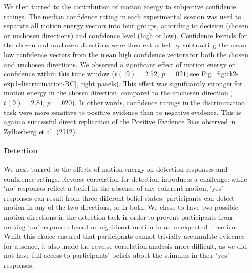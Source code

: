 \documentclass[12pt,twoside]{reedthesis}
\begin{document}
We then turned to the contribution of motion energy to subjective confidence ratings. The median confidence rating in each experimental session was used to separate all motion energy vectors into four groups, according to decision (chosen or unchosen directions) and confidence level (high or low). Confidence kernels for the chosen and unchosen directions were then extracted by subtracting the mean low confidence vectors from the mean high confidence vectors for both the chosen and unchosen directions. We observed a significant effect of motion energy on confidence within this time window (\(t(19) = 2.52\), \(p = .021\); see Fig. \ref{fig:ch2-exp1-discrimination-RC}, right panels). This effect was significantly stronger for motion energy in the chosen direction, compared to the unchosen direction (\(t(9) = 2.81\), \(p = .020\)). In other words, confidence ratings in the discrimination task were more sensitive to positive evidence than to negative evidence. This is again a successful direct replication of the Positive Evidence Bias observed in Zylberberg et al. (2012).

\hypertarget{detection}{%
\paragraph{Detection}\label{detection}}

We next turned to the effects of motion energy on detection responses and confidence ratings. Reverse correlation for detection introduces a challenge: while `no' responses reflect a belief in the absence of any coherent motion, `yes' responses can result from three different belief states: participants can detect motion in any of the two directions, or in both. We chose to have two possible motion directions in the detection task in order to prevent participants from making `no' responses based on significant motion in an unexpected direction. While this choice ensured that participants cannot trivially accumulate evidence for absence, it also made the reverse correlation analysis more difficult, as we did not have full access to participants' beliefs about the stimulus in their `yes' responses.
\end{document}
